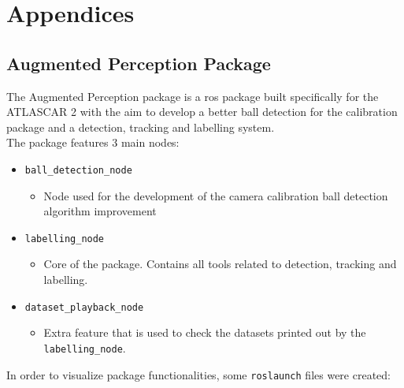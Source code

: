 
\chapter{Appendices}

\section{Augmented Perception Package}

The Augmented Perception package is a \gls{ros} package built specifically for the ATLASCAR 2 with the aim to develop a better ball detection for the calibration package and a detection, tracking and labelling system.\\

The package features 3 main nodes:

\begin{itemize}
	\item \texttt{ball\_detection\_node}
	\begin{itemize}
		\item Node used for the development of the camera calibration ball detection algorithm improvement
	\end{itemize}
	\item \texttt{labelling\_node}
	\begin{itemize}
		\item Core of the package. Contains all tools related to detection, tracking and labelling.
	\end{itemize}
	\item \texttt{dataset\_playback\_node}
	\begin{itemize}
		\item Extra feature that is used to check the datasets printed out by the \texttt{labelling\_node}.
	\end{itemize}
\end{itemize}

In order to visualize package functionalities, some \texttt{roslaunch} files were created:

